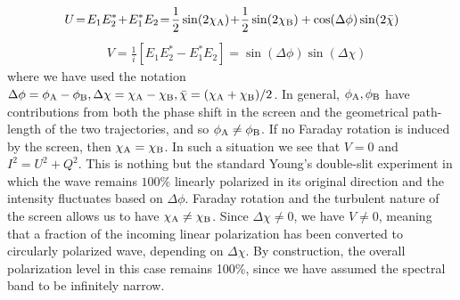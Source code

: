 \documentclass[fleqn,usenatbib]{mnras}
\begin{document}
	\begin{eqnarray}
		\label{eq:Uslit}
		U\!=\! E_{1}E_{2}^*\!+\!E_{1}^*E_{2}\!=\!\frac{1}{2}\sin(2\chi_{\rm A})\!+\!\frac{1}{2}\sin(2\chi_{\rm B}) + \cos(\Delta \phi)\sin(2 \bar{\chi})
	\end{eqnarray}
	\begin{eqnarray}
		\label{eq:Vslit}
		& V=\frac{1}{i} \left[ E_{1}E_{2}^*-E_{1}^*E_{2} \right] =\sin(\Delta \phi)\sin(\Delta \chi)
	\end{eqnarray}
	where we have used the notation $\Delta \phi=\phi_{\rm A}-\phi_{\rm B}, \Delta \chi =\chi_{\rm A}-\chi_{\rm B},\bar{\chi}=(\chi_{\rm A}+\chi_{\rm B})/2$.
	In general, $\phi_{\rm A},\phi_{\rm B}$ have contributions from both the phase shift in the screen and the geometrical path-length of the two trajectories, and so $\phi_{\rm A}\neq \phi_{\rm B}$. 
	If no Faraday rotation is induced by the screen, then $\chi_{\rm A}=\chi_{\rm B}$. In such a situation we see that $V=0$ and $I^2=U^2+Q^2$. This is nothing but the standard Young's double-slit experiment in which the wave remains $100\%$ linearly polarized in its original direction and the intensity fluctuates based on $\Delta \phi$. Faraday rotation and the turbulent nature of the screen allows us to have $\chi_{\rm A}\neq \chi_{\rm B}$. Since $\Delta \chi \neq 0$, we have $V\neq 0$, meaning that a fraction of the incoming linear polarization has been converted to circularly polarized wave, depending on $\Delta \chi$. By construction, the overall polarization level in this case remains 100\%, since we have assumed the spectral band to be infinitely narrow.
	
\end{document}
